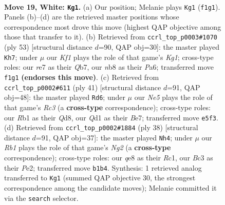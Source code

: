 \documentclass[11pt]{article}
\begin{document}
\clearpage

\begin{figure}[p]\centering
\begin{subfigure}{0.46\textwidth}\centering
\resizebox{\linewidth}{!}{%
\newchessgame
\chessboard[
  setfen={rnb1q1k1/1p2r1pp/8/p2pNp1n/8/2B1P1P1/P4PBP/1R1QRK2 w - - 0 19},
  showmover=false,
  pgfstyle=straightmove, color=movearrow, markmove={f1-g1}
]}
\caption{}
\end{subfigure}\hfill
\begin{subfigure}{0.46\textwidth}\centering
\resizebox{\linewidth}{!}{%
\newchessgame
\chessboard[
  setfen={2r2rk1/1q2bp2/p1Np2pP/3Pp2n/1PB4P/5P2/P6R/1K1RQ3 b - - 0 27},
  showmover=false,
  pgfstyle=straightmove, color=movearrow, markmove={g8-h7}
]}
\caption{}
\end{subfigure}
\\[4pt]
\begin{subfigure}{0.46\textwidth}\centering
\resizebox{\linewidth}{!}{%
\newchessgame
\chessboard[
  setfen={3q1rk1/4bpp1/p1r1pn1p/P7/3P4/2N2Q2/1P3PPP/R1BR2K1 b - - 1 21},
  showmover=false,
  pgfstyle=straightmove, color=movearrow, markmove={c6-d6}
]}
\caption{}
\end{subfigure}\hfill
\begin{subfigure}{0.46\textwidth}\centering
\resizebox{\linewidth}{!}{%
\newchessgame
\chessboard[
  setfen={2r1r1k1/p3qpp1/1p1b3p/2p1n3/1P6/P3B1P1/2Q1PPNP/2RR2K1 w - - 0 20},
  showmover=false,
  pgfstyle=straightmove, color=movearrow, markmove={g2-h4}
]}
\caption{}
\end{subfigure}
\caption{\textbf{Move 19, White: \texttt{Kg1}.} (a) Our position; Melanie plays \texttt{Kg1} (\texttt{f1g1}). Panels (b)--(d) are the retrieved master positions whose correspondence most drove this move (highest QAP objective among those that transfer to it). (b) Retrieved from \texttt{ccrl\_top\_p0003\#1070} (ply 53) [structural distance $d$=90, QAP obj=30]: the master played \texttt{Kh7}; under $\mu$ our \emph{Kf1} plays the role of that game's \emph{Kg1}; cross-type roles: our \emph{r}e7 as their \emph{Q}b7, our \emph{n}b8 as their \emph{P}a6; transferred move \texttt{f1g1} \textbf{(endorses this move)}. (c) Retrieved from \texttt{ccrl\_top\_p0002\#611} (ply 41) [structural distance $d$=91, QAP obj=48]: the master played \texttt{Rd6}; under $\mu$ our \emph{Ne5} plays the role of that game's \emph{Rc3} (a \textbf{cross-type} correspondence); cross-type roles: our \emph{R}b1 as their \emph{Q}d8, our \emph{Q}d1 as their \emph{B}e7; transferred move \texttt{e5f3}. (d) Retrieved from \texttt{ccrl\_top\_p0002\#1884} (ply 38) [structural distance $d$=91, QAP obj=37]: the master played \texttt{Nh4}; under $\mu$ our \emph{Rb1} plays the role of that game's \emph{Ng2} (a \textbf{cross-type} correspondence); cross-type roles: our \emph{q}e8 as their \emph{R}c1, our \emph{B}c3 as their \emph{P}e2; transferred move \texttt{b1b4}. Synthesis: 1 retrieved analog transferred to \texttt{Kg1} (summed QAP objective 30, the strongest correspondence among the candidate moves); Melanie committed it via the \texttt{search} selector.}
\label{fig:thought-m36}
\end{figure}
\end{document}
